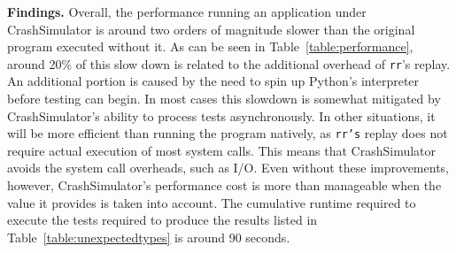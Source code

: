 {\bf Findings.}
Overall, the performance running an application
under CrashSimulator is around
two orders of magnitude slower
than the original program executed without it.
As can be seen in Table~\ref{table:performance}, around 20\%
of this slow down is related to the additional overhead of {\tt rr}'s replay.
An additional portion is caused by the need to spin up Python's interpreter
before testing can begin.
In most cases
this slowdown is somewhat mitigated by CrashSimulator's ability to process
tests asynchronously. In other situations, it will be more efficient than
running the program natively, as {\tt rr's} replay does not require
actual execution of most system calls.  This means that CrashSimulator
avoids the system call overheads, such as I/O.
Even without these improvements, however, CrashSimulator's performance
cost is more
than manageable when the value it provides is taken into account.  The
cumulative runtime required to execute the tests required to produce the
results listed in Table~\ref{table:unexpectedtypes} is around 90 seconds.
